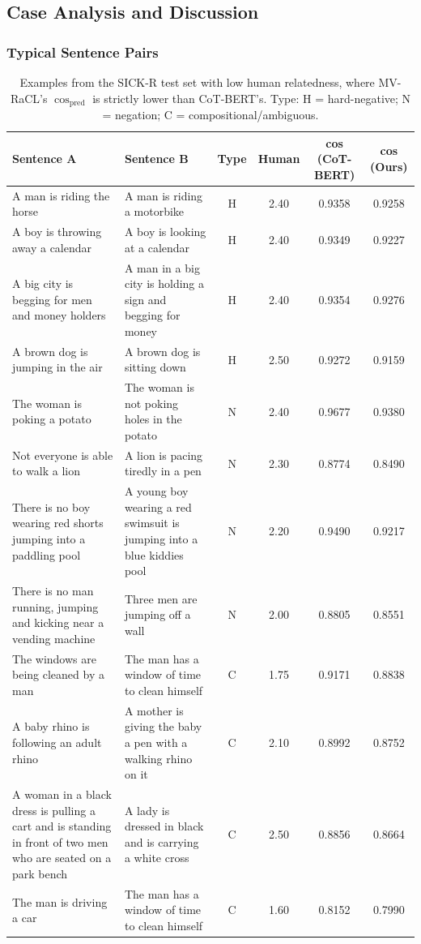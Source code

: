 \documentclass[a4paper,fleqn]{cas-dc}
\begin{document}
\subsection{Case Analysis and Discussion}
\label{subsec:case}

\subsubsection{Typical Sentence Pairs}

\begin{table}[t]
\centering
\caption{Examples from the SICK-R test set with low human relatedness, where MV-RaCL's $\cos_{\mathrm{pred}}$ is strictly lower than CoT-BERT's. Type: H = hard-negative; N = negation; C = compositional/ambiguous.}
\label{tab:cases}
\small
\setlength{\tabcolsep}{2pt}
\renewcommand{\arraystretch}{1.05}
\begin{tabular}{p{}p{}cccc}
\toprule
Sentence A & Sentence B & Type & Human & cos (CoT-BERT) & cos (Ours) \\
\midrule
A man is riding the horse & A man is riding a motorbike & H & 2.40 & 0.9358 & 0.9258 \\
A boy is throwing away a calendar & A boy is looking at a calendar & H & 2.40 & 0.9349 & 0.9227 \\
A big city is begging for men and money holders & A man in a big city is holding a sign and begging for money & H & 2.40 & 0.9354 & 0.9276 \\
A brown dog is jumping in the air & A brown dog is sitting down & H & 2.50 & 0.9272 & 0.9159 \\
The woman is poking a potato & The woman is not poking holes in the potato & N & 2.40 & 0.9677 & 0.9380 \\
Not everyone is able to walk a lion & A lion is pacing tiredly in a pen & N & 2.30 & 0.8774 & 0.8490 \\
There is no boy wearing red shorts jumping into a paddling pool & A young boy wearing a red swimsuit is jumping into a blue kiddies pool & N & 2.20 & 0.9490 & 0.9217 \\
There is no man running, jumping and kicking near a vending machine & Three men are jumping off a wall & N & 2.00 & 0.8805 & 0.8551 \\
The windows are being cleaned by a man & The man has a window of time to clean himself & C & 1.75 & 0.9171 & 0.8838 \\
A baby rhino is following an adult rhino & A mother is giving the baby a pen with a walking rhino on it & C & 2.10 & 0.8992 & 0.8752 \\
A woman in a black dress is pulling a cart and is standing in front of two men who are seated on a park bench & A lady is dressed in black and is carrying a white cross & C & 2.50 & 0.8856 & 0.8664 \\
The man is driving a car & The man has a window of time to clean himself & C & 1.60 & 0.8152 & 0.7990 \\
\bottomrule
\end{tabular}
\end{table}
\end{document}
